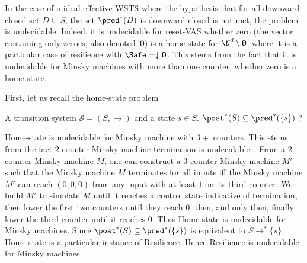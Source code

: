 In the case
of a ideal-effective WSTS 
where the hypothesis that
{for all downward-closed set $D \subseteq S$, the set $\pred^*(D)$ is downward-closed}
is not met, the problem is undecidable.
 Indeed, it is 
undecidable for reset-VAS whether zero (the vector containing only zeroes, also denoted~$ \textbf{0}$) is a home-state for $\N^d \setminus \textbf{0}$, where it is a particular case of resilience with $\Safe = \downarrow \textbf{0}$. This stems from the fact that it is undecidable for Minsky machines with more than one counter, whether zero is a home-state. %



First, let us recall the home-state problem

{A transition system $\mathscr{S}=(S,\rightarrow)$ and a state $s \in S$.}
{$\post^*(S) \subseteq \pred^*(\{s\})$ ?\newline}



Home-state is undecidable for Minsky machine with $3+$ counters.
This stems from the fact $2$-counter Minsky machine termination is undecidable~\cite{Min61,Min67}.
From a $2$-counter Minsky machine $M$, one can construct a $3$-counter Minsky machine $M'$ 
such that the Minsky machine $M$ terminates for all inputs iff the Minsky machine $M'$ can reach $(0,0,0)$ from any input with at least $1$ on its third counter. We build $M'$ to simulate $M$ until it reaches a control state indicative of termination, then lower the first two counters until they reach $0$, then, and only then, finally lower the third counter until it reaches $0$.
Thus {\sc Home-state} is undecidable for Minsky machines. Since $\post^*(S) \subseteq \pred^*(\{s\})$ is equivalent to $S \rightarrow^* \{s\}$,  {\sc Home-state} is a particular instance of {\sc Resilience}. Hence {\sc Resilience} is undecidable for Minsky machines.


